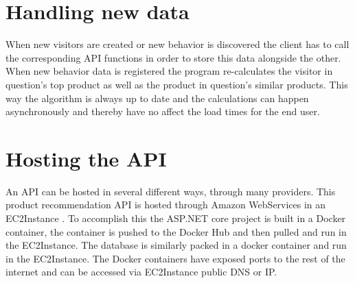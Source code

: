 \section{Handling new data}
When new visitors are created or new behavior is discovered the client has to call the corresponding API functions in order to store this data alongside the other. When new behavior data is registered the program re-calculates the visitor in question's top product as well as the product in question's similar products. This way the algorithm is always up to date and the calculations can happen asynchronously and thereby have no affect the load times for the end user.

\section{Hosting the API}
An API can be hosted in several different ways, through many providers. This product recommendation API is hosted through Amazon WebServices in an \gls{EC2Instance} \cite{EC2}. To accomplish this the ASP.NET core project is built in a Docker container, the container is pushed to the Docker Hub and then pulled and run in the \gls{EC2Instance}. The database is similarly packed in a docker container and run in the \gls{EC2Instance}. The Docker containers have exposed ports to the rest of the internet and can be accessed via \gls{EC2Instance} public DNS or IP.



			


 